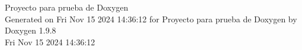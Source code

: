 \documentclass[twoside]{article}
\newcommand{\+}{\discretionary{\mbox{\scriptsize$\hookleftarrow$}}{}{}}
\newcommand{\clearemptydoublepage}{%
    \newpage{\pagestyle{empty}\cleardoublepage}%
  }
\begin{document}
  \raggedbottom
    \hypersetup{pageanchor=false,
                bookmarksnumbered=true,
                pdfencoding=unicode
               }
  \begin{titlepage}
  \vspace*{7cm}
  \begin{center}%
  {\Large Proyecto para prueba de Doxygen}\\
  \vspace*{1cm}
  {\large Generated on Fri Nov 15 2024 14\+:36\+:12 for Proyecto para prueba de Doxygen by Doxygen 1.9.8}\\
    \vspace*{0.5cm}
    {\small Fri Nov 15 2024 14:36:12}
  \end{center}
  \end{titlepage}
  \tableofcontents
  \hypersetup{pageanchor=true}
  \newpage
  \clearemptydoublepage
  \printindex
\end{document}
